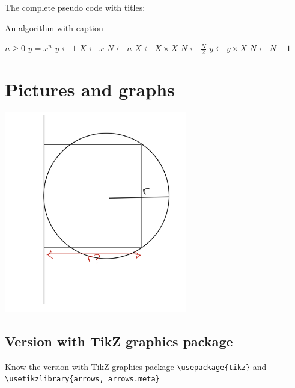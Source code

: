 \documentclass[12pt,a4paper]{article}
\theoremstyle{definition}
\theoremstyle{remark}
\begin{document}
The complete pseudo code with titles:

\begin{algorithm}
\caption{An algorithm with caption}\label{alg:cap}
\begin{algorithmic}[1]
\Require $n \geq 0$
\Ensure $y = x^n$
\State $y \gets 1$
\State $X \gets x$
\State $N \gets n$
    \State $X \gets X \times X$
    \State $N \gets \frac{N}{2}$  
    \State $y \gets y \times X$
    \State $N \gets N - 1$
\EndIf
\EndWhile
\end{algorithmic}
\end{algorithm}



\section{Pictures and graphs}\label{sec:pictures_graphs}

\includegraphics[width=0.6\textwidth]{./figs/radius_scure.jpg}

\subsection{Version with TikZ graphics package}
Know the version with TikZ graphics package \verb|\usepackage{tikz}| and \newline \verb|\usetikzlibrary{arrows, arrows.meta}| 

\begin{center}
\end{center}
\end{document}
